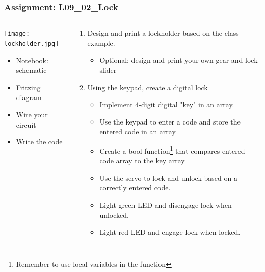 \documentclass{beamer}
\begin{document}
\begin{frame}\frametitle{Assignment: L09\_02\_Lock}
\begin{columns}
\begin{column}{4cm}
\begin{center}
\texttt{[image: lockholder.jpg]}
\end{center}
\begin{itemize}
\item Notebook: schematic
\item Fritzing diagram
\item Wire your circuit
\item Write the code
\end{itemize}
\end{column}
\begin{column}{8.3cm}
\begin{enumerate}
\item Design and print a lockholder based on the class example.
	\begin{itemize}
	\item Optional: design and print your own gear and lock slider
	\end{itemize}
\item Using the keypad, create a digital lock
		\begin{itemize}
		\item Implement 4-digit digital "key" in an array.
		\item Use the keypad to enter a code and store the entered code in an array
		\item Create a bool function\footnote{Remember to use local variables in the function} that compares entered code array to the key array 
		\item Use the servo to lock and unlock based on a correctly entered code.
		\item Light green LED and disengage lock when unlocked.
		\item Light red LED and engage lock when locked.
		\end{itemize}
\end{enumerate}
\end{column}
\end{columns}
\end{frame}
\end{document}
